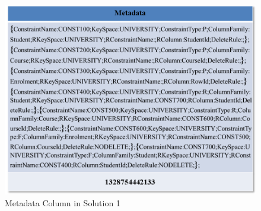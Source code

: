
	\begin{figure}[h] 
			\centering
				\includegraphics[width=1\textwidth]{./figure/Solutions/Sol1-MD-Col.png}
				\caption{Metadata Column in Solution 1}
				\label{fd:Metadata-Column}
	\end{figure}
	    

% 	
		
